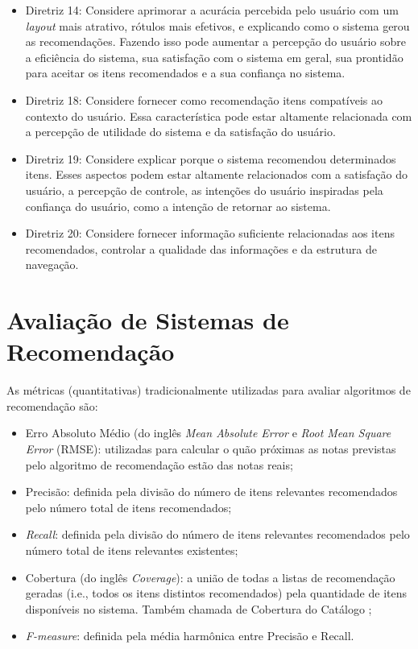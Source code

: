 \begin{itemize}
\item Diretriz 14: Considere aprimorar a acurácia percebida pelo usuário com um \textit{layout} mais atrativo, rótulos mais
efetivos, e explicando como o sistema gerou as recomendações. Fazendo isso pode aumentar a percepção do usuário sobre a
eficiência do sistema, sua satisfação com o sistema em geral, sua prontidão para aceitar os itens recomendados e a sua
confiança no sistema.
\item Diretriz 18: Considere fornecer como recomendação itens compatíveis ao contexto do usuário. Essa característica
pode estar altamente relacionada com a percepção de utilidade do sistema e da satisfação do usuário.
\item Diretriz 19: Considere explicar porque o sistema recomendou determinados itens. Esses aspectos podem estar
altamente relacionados com a satisfação do usuário, a percepção de controle, as intenções do usuário inspiradas pela
confiança do usuário, como a intenção de retornar ao sistema.
\item Diretriz 20: Considere fornecer informação suficiente relacionadas aos itens recomendados, controlar a qualidade
das informações e da estrutura de navegação.
\end{itemize}

\section{Avaliação de Sistemas de Recomendação}\label{section:fundamentacao-avaliacao-sr}

As métricas (quantitativas) tradicionalmente utilizadas para avaliar algoritmos de recomendação são:

\begin{itemize}
\item Erro Absoluto Médio (do inglês \textit{Mean Absolute Error} e \textit{Root Mean Square Error} (RMSE): utilizadas
para calcular o quão próximas as notas previstas pelo algoritmo de recomendação estão das notas reais;
\item Precisão: definida pela divisão do número de itens relevantes recomendados pelo número total de itens recomendados;
\item \textit{Recall}: definida pela divisão do número de itens relevantes recomendados pelo número total de itens
relevantes existentes;
\item Cobertura (do inglês \textit{Coverage}): a união de todas a listas de recomendação geradas (i.e., todos os itens
distintos recomendados) pela quantidade de itens disponíveis no sistema. Também chamada de Cobertura do Catálogo \cite{ge2010beyond};
\item \textit{F-measure}: definida pela média harmônica entre Precisão e Recall.
\end{itemize}

